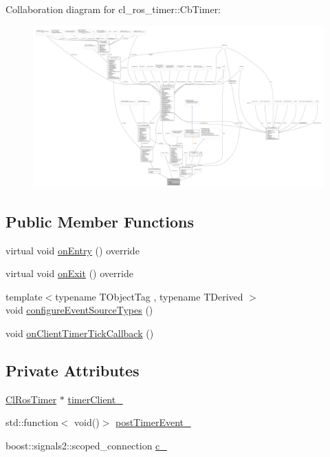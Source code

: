 Collaboration diagram for cl\+\_\+ros\+\_\+timer\+:\+:Cb\+Timer\+:
\nopagebreak
\begin{figure}[H]
\begin{center}
\leavevmode
\includegraphics[width=350pt]{classcl__ros__timer_1_1CbTimer__coll__graph}
\end{center}
\end{figure}
\subsection*{Public Member Functions}
\begin{DoxyCompactItemize}
\item 
virtual void \hyperlink{classcl__ros__timer_1_1CbTimer_aceba45e86271cf1b7333e2f42c246a38}{on\+Entry} () override
\item 
virtual void \hyperlink{classcl__ros__timer_1_1CbTimer_a04184e2679c32363c876e1d6b4746072}{on\+Exit} () override
\item 
{\footnotesize template$<$typename T\+Object\+Tag , typename T\+Derived $>$ }\\void \hyperlink{classcl__ros__timer_1_1CbTimer_a09267b38fed9b6db637eba8b2f789d1c}{configure\+Event\+Source\+Types} ()
\item 
void \hyperlink{classcl__ros__timer_1_1CbTimer_a9895eb7e05a5922fa27f2bc46f5486a0}{on\+Client\+Timer\+Tick\+Callback} ()
\end{DoxyCompactItemize}
\subsection*{Private Attributes}
\begin{DoxyCompactItemize}
\item 
\hyperlink{classcl__ros__timer_1_1ClRosTimer}{Cl\+Ros\+Timer} $\ast$ \hyperlink{classcl__ros__timer_1_1CbTimer_aefff167dbfbc54485f700a2c6b2479a5}{timer\+Client\+\_\+}
\item 
std\+::function$<$ void()$>$ \hyperlink{classcl__ros__timer_1_1CbTimer_ad2b7913a84459d635fdcca8d346c7af2}{post\+Timer\+Event\+\_\+}
\item 
boost\+::signals2\+::scoped\+\_\+connection \hyperlink{classcl__ros__timer_1_1CbTimer_a2713f692e11ee82ea55080938d339881}{c\+\_\+}
\end{DoxyCompactItemize}
